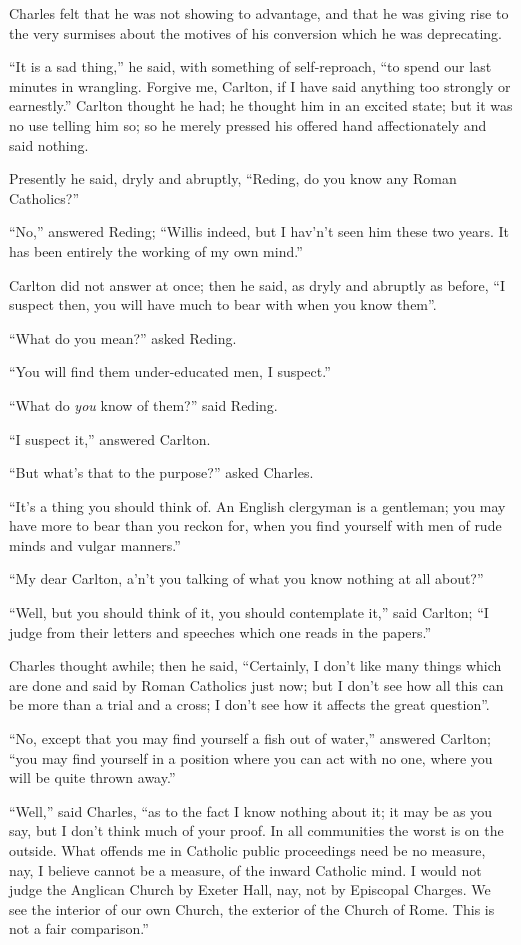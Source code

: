 Charles felt that he was not showing to advantage, and that he was
giving rise to the very surmises about the motives of his conversion
which he was deprecating.

``It is a sad thing,'' he said, with something of
self-reproach, ``to spend our last minutes in wrangling. Forgive
me, Carlton, if I have said anything too strongly or earnestly.''
Carlton thought he had; he thought him in an excited state; but it was
no use telling him so; so he merely pressed his offered hand
affectionately and said nothing.

Presently he said, dryly and abruptly, ``Reding, do you know
any Roman Catholics?''

``No,'' answered Reding; ``Willis indeed, but I hav'n't
seen him these two years. It has been entirely the working of my own
mind.''

Carlton did not answer at once; then he said, as dryly and abruptly
as before, ``I suspect then, you will have much to bear with when
you know them''.

``What do you mean?'' asked Reding.

``You will find them under-educated men, I suspect.''

``What do \emph{you} know of them?'' said Reding.

``I suspect it,'' answered Carlton.

``But what's that to the purpose?'' asked Charles.

``It's a thing you should think of. An English clergyman is a
gentleman; you may have more to bear than you reckon for, when you
find yourself with men of rude minds and vulgar manners.''

``My dear Carlton, a'n't you talking of what you know nothing
at all about?''

``Well, but you should think of it, you should contemplate
it,'' said Carlton; ``I judge from their letters and
speeches which one reads in the papers.''

Charles thought awhile; then he said, ``Certainly, I don't like
many things which are done and said by Roman Catholics just now; but I
don't see how all this can be more than a trial and a cross; I don't
see how it affects the great question''.

``No, except that you may find yourself a fish out of
water,'' answered Carlton; ``you may find yourself in a
position where you can act with no one, where you will be quite thrown
away.''

``Well,'' said Charles, ``as to the fact I know nothing
about it; it may be as you say, but I don't think much of your proof.
In all communities the worst is on the outside. What offends me in
Catholic public proceedings need be no measure, nay, I believe cannot
be a measure, of the inward Catholic mind. I would not judge the
Anglican Church by Exeter Hall, nay, not by Episcopal Charges. We see
the interior of our own Church, the exterior of the Church of Rome.
This is not a fair comparison.''


